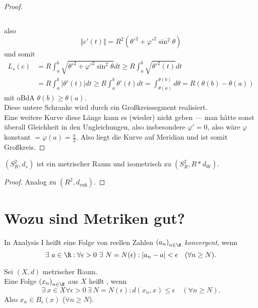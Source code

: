 \begin{lemma}
\begin{proof}
\begin{small}
\begin{equation*}
      \end{equation*}
    \end{small}
    also
    \begin{equation*}
      \Vert c'(t) \Vert = R^2({\theta'}^2 + {\varphi'}^2\sin^2\theta)
    \end{equation*}
    und somit
    \begin{align*}
      L_s(c) &= R\int_a^b\sqrt{{\theta'}^2+{\varphi'}^2\sin^2\theta}dt \geq R\int_a^b\sqrt{{\theta'}^2(t)}dt \\
      &= R\int_a^b \vert \theta'(t) \vert dt \geq R\int_a^b \theta'(t)dt = \int_{\theta(a)}^{\theta(b)}d\theta = R(\theta(b)-\theta(a))
    \end{align*}
    mit oBdA \( \theta(b) \geq \theta(a) \). \\
    Diese untere Schranke wird durch ein Großkreissegment realisiert. \\
    Eine weitere Kurve diese Länge kann es (wieder) nicht geben --- man hätte sonst überall Gleichheit in den Ungleichungen, also insbesondere \( \varphi' = 0 \), also wäre \( \varphi \) konstant \( = \varphi(a) = \frac{\pi}{2} \). Also liegt die Kurve auf Meridian und ist somit Großkreis.
  \end{proof}
\end{lemma}

\begin{theorem}
  \( (S^2_R, d_s) \) ist ein metrischer Raum und isometrisch zu \( (S^2_R, R*d_W) \).
  \begin{proof}
    Analog zu \( (R^2, d_\text{euk}) \).
  \end{proof}
\end{theorem}

\section{Wozu sind Metriken gut?}

\begin{remark}
  In Analysis I heißt eine Folge von reellen Zahlen \( {(a_n)}_{n \in \N} \) \emph{konvergent}, wenn
  \begin{equation*}
    \exists \ a \in \R : \forall \epsilon > 0 \ \exists \ N = N(\epsilon) : \vert a_n - a \vert < \epsilon \quad (\forall n \geq N)\text{.}
  \end{equation*}
\end{remark}

\begin{remark}
  Sei \( (X, d) \) metrischer Raum. \\
  Eine Folge \( {(x_n)}_{n \in \N} \) aus \( X \) heißt , wenn
  \begin{equation*}
    \exists \ x \in X \forall \epsilon > 0 \ \exists \ N = N(\epsilon) : d(x_n, x) \leq \epsilon \quad (\forall n \geq N)\text{.}
  \end{equation*}
  Also \( x_n \in B_\epsilon(x) \) (\( \forall{} n \geq{} N \)).
\end{remark}

